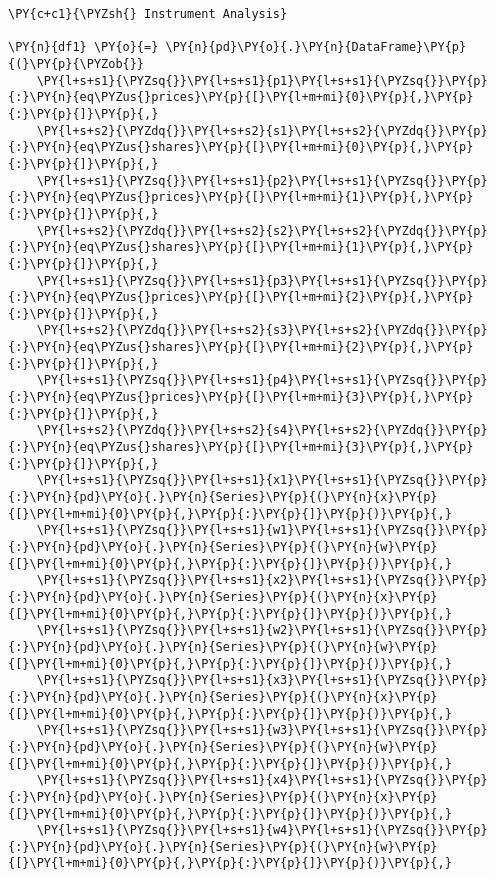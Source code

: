     \begin{tcolorbox}[breakable, size=fbox, boxrule=1pt, pad at break*=1mm,colback=cellbackground, colframe=cellborder]
\begin{Verbatim}[commandchars=\\\{\}]
\PY{c+c1}{\PYZsh{} Instrument Analysis}

\PY{n}{df1} \PY{o}{=} \PY{n}{pd}\PY{o}{.}\PY{n}{DataFrame}\PY{p}{(}\PY{p}{\PYZob{}}
    \PY{l+s+s1}{\PYZsq{}}\PY{l+s+s1}{p1}\PY{l+s+s1}{\PYZsq{}}\PY{p}{:}\PY{n}{eq\PYZus{}prices}\PY{p}{[}\PY{l+m+mi}{0}\PY{p}{,}\PY{p}{:}\PY{p}{]}\PY{p}{,}
    \PY{l+s+s2}{\PYZdq{}}\PY{l+s+s2}{s1}\PY{l+s+s2}{\PYZdq{}}\PY{p}{:}\PY{n}{eq\PYZus{}shares}\PY{p}{[}\PY{l+m+mi}{0}\PY{p}{,}\PY{p}{:}\PY{p}{]}\PY{p}{,}
    \PY{l+s+s1}{\PYZsq{}}\PY{l+s+s1}{p2}\PY{l+s+s1}{\PYZsq{}}\PY{p}{:}\PY{n}{eq\PYZus{}prices}\PY{p}{[}\PY{l+m+mi}{1}\PY{p}{,}\PY{p}{:}\PY{p}{]}\PY{p}{,}
    \PY{l+s+s2}{\PYZdq{}}\PY{l+s+s2}{s2}\PY{l+s+s2}{\PYZdq{}}\PY{p}{:}\PY{n}{eq\PYZus{}shares}\PY{p}{[}\PY{l+m+mi}{1}\PY{p}{,}\PY{p}{:}\PY{p}{]}\PY{p}{,}
    \PY{l+s+s1}{\PYZsq{}}\PY{l+s+s1}{p3}\PY{l+s+s1}{\PYZsq{}}\PY{p}{:}\PY{n}{eq\PYZus{}prices}\PY{p}{[}\PY{l+m+mi}{2}\PY{p}{,}\PY{p}{:}\PY{p}{]}\PY{p}{,}
    \PY{l+s+s2}{\PYZdq{}}\PY{l+s+s2}{s3}\PY{l+s+s2}{\PYZdq{}}\PY{p}{:}\PY{n}{eq\PYZus{}shares}\PY{p}{[}\PY{l+m+mi}{2}\PY{p}{,}\PY{p}{:}\PY{p}{]}\PY{p}{,}
    \PY{l+s+s1}{\PYZsq{}}\PY{l+s+s1}{p4}\PY{l+s+s1}{\PYZsq{}}\PY{p}{:}\PY{n}{eq\PYZus{}prices}\PY{p}{[}\PY{l+m+mi}{3}\PY{p}{,}\PY{p}{:}\PY{p}{]}\PY{p}{,}
    \PY{l+s+s2}{\PYZdq{}}\PY{l+s+s2}{s4}\PY{l+s+s2}{\PYZdq{}}\PY{p}{:}\PY{n}{eq\PYZus{}shares}\PY{p}{[}\PY{l+m+mi}{3}\PY{p}{,}\PY{p}{:}\PY{p}{]}\PY{p}{,}
    \PY{l+s+s1}{\PYZsq{}}\PY{l+s+s1}{x1}\PY{l+s+s1}{\PYZsq{}}\PY{p}{:}\PY{n}{pd}\PY{o}{.}\PY{n}{Series}\PY{p}{(}\PY{n}{x}\PY{p}{[}\PY{l+m+mi}{0}\PY{p}{,}\PY{p}{:}\PY{p}{]}\PY{p}{)}\PY{p}{,}
    \PY{l+s+s1}{\PYZsq{}}\PY{l+s+s1}{w1}\PY{l+s+s1}{\PYZsq{}}\PY{p}{:}\PY{n}{pd}\PY{o}{.}\PY{n}{Series}\PY{p}{(}\PY{n}{w}\PY{p}{[}\PY{l+m+mi}{0}\PY{p}{,}\PY{p}{:}\PY{p}{]}\PY{p}{)}\PY{p}{,}
    \PY{l+s+s1}{\PYZsq{}}\PY{l+s+s1}{x2}\PY{l+s+s1}{\PYZsq{}}\PY{p}{:}\PY{n}{pd}\PY{o}{.}\PY{n}{Series}\PY{p}{(}\PY{n}{x}\PY{p}{[}\PY{l+m+mi}{0}\PY{p}{,}\PY{p}{:}\PY{p}{]}\PY{p}{)}\PY{p}{,}
    \PY{l+s+s1}{\PYZsq{}}\PY{l+s+s1}{w2}\PY{l+s+s1}{\PYZsq{}}\PY{p}{:}\PY{n}{pd}\PY{o}{.}\PY{n}{Series}\PY{p}{(}\PY{n}{w}\PY{p}{[}\PY{l+m+mi}{0}\PY{p}{,}\PY{p}{:}\PY{p}{]}\PY{p}{)}\PY{p}{,}
    \PY{l+s+s1}{\PYZsq{}}\PY{l+s+s1}{x3}\PY{l+s+s1}{\PYZsq{}}\PY{p}{:}\PY{n}{pd}\PY{o}{.}\PY{n}{Series}\PY{p}{(}\PY{n}{x}\PY{p}{[}\PY{l+m+mi}{0}\PY{p}{,}\PY{p}{:}\PY{p}{]}\PY{p}{)}\PY{p}{,}
    \PY{l+s+s1}{\PYZsq{}}\PY{l+s+s1}{w3}\PY{l+s+s1}{\PYZsq{}}\PY{p}{:}\PY{n}{pd}\PY{o}{.}\PY{n}{Series}\PY{p}{(}\PY{n}{w}\PY{p}{[}\PY{l+m+mi}{0}\PY{p}{,}\PY{p}{:}\PY{p}{]}\PY{p}{)}\PY{p}{,}
    \PY{l+s+s1}{\PYZsq{}}\PY{l+s+s1}{x4}\PY{l+s+s1}{\PYZsq{}}\PY{p}{:}\PY{n}{pd}\PY{o}{.}\PY{n}{Series}\PY{p}{(}\PY{n}{x}\PY{p}{[}\PY{l+m+mi}{0}\PY{p}{,}\PY{p}{:}\PY{p}{]}\PY{p}{)}\PY{p}{,}
    \PY{l+s+s1}{\PYZsq{}}\PY{l+s+s1}{w4}\PY{l+s+s1}{\PYZsq{}}\PY{p}{:}\PY{n}{pd}\PY{o}{.}\PY{n}{Series}\PY{p}{(}\PY{n}{w}\PY{p}{[}\PY{l+m+mi}{0}\PY{p}{,}\PY{p}{:}\PY{p}{]}\PY{p}{)}\PY{p}{,}


\end{Verbatim}
\end{tcolorbox}

